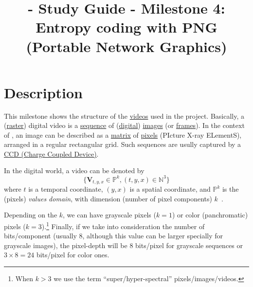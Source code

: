 
\title{\SM{} - Study Guide - Milestone 4: Entropy coding with PNG (Portable Network Graphics)}

\maketitle

\tableofcontents

\section{Description}

This milestone shows the structure of the
\href{https://en.wikipedia.org/wiki/Video}{videos} used in the
\theproject{} project. Basically, a
(\href{https://en.wikipedia.org/wiki/Raster}{raster}) digital video is
a \href{https://en.wikipedia.org/wiki/Sequence}{sequence} of
(\href{https://en.wikipedia.org/wiki/Digital_data}{digital})
\href{https://en.wikipedia.org/wiki/Image}{images} (or
\href{https://en.wikipedia.org/wiki/Film_frame}{frames}). In the
context of \theproject{}, an image can be described as a
\href{https://en.wikipedia.org/wiki/Matrix_(mathematics)}{matrix} of
\href{https://en.wikipedia.org/wiki/Pixel}{pixels} (PIcture X-ray
ELementS), arranged in a regular rectangular grid. Such sequences are
usully captured by a
\href{https://en.wikipedia.org/wiki/Charge-coupled_device}{CCD (Charge
  Coupled Device)}.

In the digital world, a video can be denoted by
\begin{equation*}
  \{{\mathbf V}_{t,y,x}\in\mathbb{P}^{k}, (t,y,x)\in\mathbb{N}^3\}
\end{equation*}
where $t$ is a temporal coordinate, $(y,x)$ is a spatial coordinate,
and $\mathbb{P}^{k}$ is the (pixels) \emph{values domain}, with
dimension (number of pixel components) $k$~\cite{burger2016digital}.


Depending on the $k$, we can have grayscale pixels ($k=1$) or
color (panchromatic) pixels ($k=3$).\footnote{When $k>3$ we use the
term ``super/hyper-spectral'' pixels/images/videos.} Finally, if we
take into consideration the number of bits/component (usually 8,
although this value can be larger specially for grayscale images), the
pixel-depth will be $8$ bits/pixel for grayscale sequences or $3\times
8=24$ bits/pixel for color ones.

